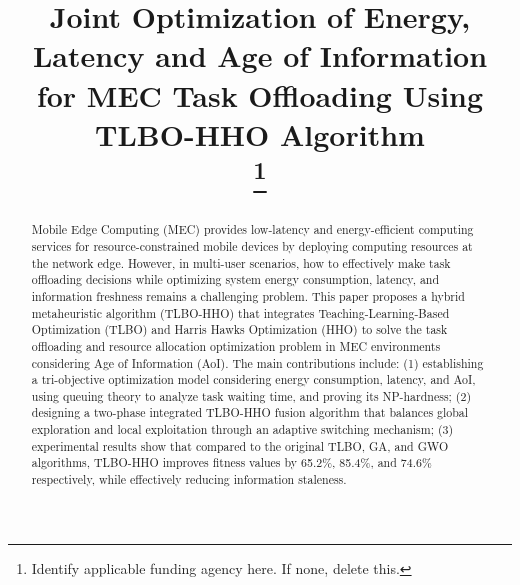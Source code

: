 \documentclass[conference]{IEEEtran}
\begin{document}
\title{Joint Optimization of Energy, Latency and Age of Information for MEC Task Offloading Using TLBO-HHO Algorithm\\
\thanks{Identify applicable funding agency here. If none, delete this.}
}

\author{
\and
{}
\and
{}
}

\maketitle

\begin{abstract}
Mobile Edge Computing (MEC) provides low-latency and energy-efficient computing services for resource-constrained mobile devices by deploying computing resources at the network edge. However, in multi-user scenarios, how to effectively make task offloading decisions while optimizing system energy consumption, latency, and information freshness remains a challenging problem. This paper proposes a hybrid metaheuristic algorithm (TLBO-HHO) that integrates Teaching-Learning-Based Optimization (TLBO) and Harris Hawks Optimization (HHO) to solve the task offloading and resource allocation optimization problem in MEC environments considering Age of Information (AoI). The main contributions include: (1) establishing a tri-objective optimization model considering energy consumption, latency, and AoI, using queuing theory to analyze task waiting time, and proving its NP-hardness; (2) designing a two-phase integrated TLBO-HHO fusion algorithm that balances global exploration and local exploitation through an adaptive switching mechanism; (3) experimental results show that compared to the original TLBO, GA, and GWO algorithms, TLBO-HHO improves fitness values by 65.2\%, 85.4\%, and 74.6\% respectively, while effectively reducing information staleness.
\end{abstract}
\end{document}

